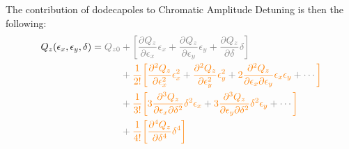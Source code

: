 The contribution of dodecapoles to Chromatic Amplitude Detuning is then the following:
\begin{equation}
  \begin{aligned}
  Q_z(\epsilon_x, \epsilon_y, \delta) = \color{gray}Q_{z0} &\color{gray}+
                                                  \left[
                                                     \frac{\partial Q_z}{\partial \epsilon_x} \epsilon_x
                                                   + \frac{\partial Q_z}{\partial \epsilon_y} \epsilon_y
                                                   + \frac{\partial Q_z}{\partial \delta} \delta
                                                  \right] \\
                                               &\color{gray}
                                               + \textcolor{orange}{\frac{1}{2!} \biggl[}
                                                   \textcolor{orange}{\frac{\partial^2Q_z}{\partial \epsilon_x^2}\epsilon_x^2}
                                                 + \textcolor{orange}{\frac{\partial^2Q_z}{\partial \epsilon_y^2}\epsilon_y^2}
                                                 + \textcolor{orange}{2 \frac{\partial^2Q_z}{\partial \epsilon_x \partial \epsilon_y}\epsilon_x \epsilon_y}
                                                 + \cdots
                                               \textcolor{orange}{\biggr]} \\
                                               &\color{gray}+ \textcolor{orange}{\frac{1}{3!}
                                               \biggl[}
                                                 \color{gray}
                                                  \textcolor{orange}{3 \frac{\partial^{3} Q_z}{\partial \epsilon_{x}\partial \delta^{2}} \delta^{2} \epsilon_{x}}
                                                  + \textcolor{orange}{3  \frac{\partial^{3} Q_z}{\partial \epsilon_{y}\partial \delta^{2}}  \delta^{2} \epsilon_{y}}
                                                  + \cdots
                                                \textcolor{orange}{\biggr]}\\
                                           &\color{gray}
                                           + \textcolor{orange}{\frac{1}{4!} \biggl[ \frac{\partial^4 Q_z}{\partial \delta^4} \delta^4 \biggr] }
  \end{aligned}
\end{equation}




